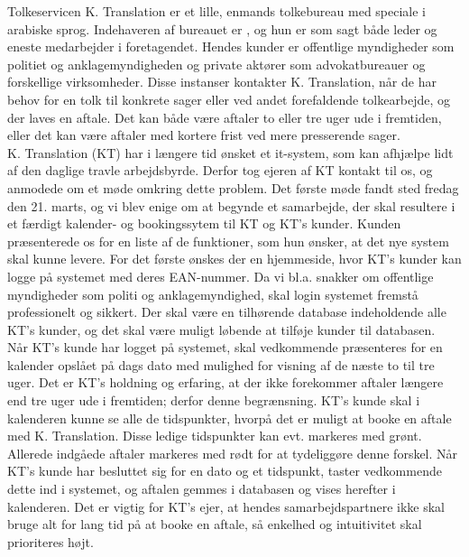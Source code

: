 \documentclass[12pt]{article}   %
\begin{document}
Tolkeservicen K. Translation er et lille, enmands tolkebureau med speciale i arabiske 
sprog. Indehaveren af bureauet er , og hun er som sagt både leder og eneste
medarbejder i foretagendet. Hendes kunder er offentlige myndigheder som
politiet og anklagemyndigheden og private aktører som advokatbureauer og
forskellige virksomheder. Disse instanser kontakter K. Translation, når de har
behov for en tolk til konkrete sager eller ved andet forefaldende
tolkearbejde, og der laves en aftale. Det kan både være aftaler to eller tre uger 
ude i fremtiden, eller det kan være aftaler med kortere frist ved mere presserende 
sager.\\
K. Translation (KT) har i længere tid ønsket et it-system, som kan
afhjælpe lidt af den daglige travle arbejdsbyrde. Derfor tog ejeren af KT
kontakt til os, og anmodede om et møde omkring dette problem. Det første møde fandt 
sted fredag den 21. marts, og vi blev enige om at begynde et samarbejde, der
skal resultere i et færdigt kalender- og bookingssytem til KT og KT's kunder.
Kunden præsenterede os for en liste af de funktioner, som hun ønsker, at det nye system
skal kunne levere. For det første ønskes der en hjemmeside, hvor KT's kunder
kan logge på systemet med deres EAN-nummer. Da vi bl.a. snakker om offentlige
myndigheder som politi og anklagemyndighed, skal login systemet fremstå
professionelt og sikkert. Der skal være en tilhørende database indeholdende
alle KT's kunder, og det skal være muligt løbende at tilføje kunder til
databasen. \\
Når KT's kunde har logget på systemet, skal vedkommende præsenteres for en
kalender opslået på dags dato med mulighed for visning af de næste to til tre
uger. Det er KT's holdning og erfaring, at der ikke forekommer aftaler længere
end tre uger ude i fremtiden; derfor denne begrænsning. KT's kunde skal i
kalenderen kunne se alle de tidspunkter, hvorpå det er muligt at booke en
aftale med K. Translation. Disse ledige tidspunkter kan evt. markeres med
grønt. Allerede indgåede aftaler markeres med rødt for at tydeliggøre
denne forskel. Når KT's kunde har besluttet sig for en dato og et tidspunkt,
taster vedkommende dette ind i systemet, og aftalen gemmes i databasen og
vises herefter i kalenderen. Det er vigtig for KT's ejer, at hendes
samarbejdspartnere ikke skal bruge alt for lang tid på at booke en aftale, så
enkelhed og intuitivitet skal prioriteres højt.\\
\end{document}
